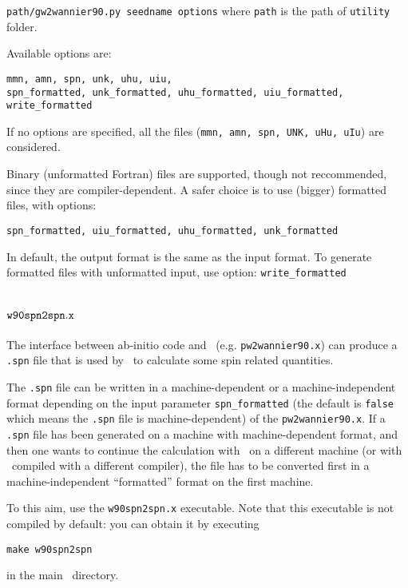 \verb|path/gw2wannier90.py seedname options|
\newline \newline
where \verb|path| is the path of \verb|utility| folder.\newline\newline

Available options are:
\begin{verbatim}
mmn, amn, spn, unk, uhu, uiu,
spn_formatted, unk_formatted, uhu_formatted, uiu_formatted,
write_formatted
\end{verbatim}

If no options are specified, all the files (\verb|mmn, amn, spn, UNK, uHu, uIu|) are considered.

Binary (unformatted Fortran) files are supported, though not reccommended, 
since they are compiler-dependent.
A safer choice is to use (bigger) formatted files, with options:

\verb|spn_formatted, uiu_formatted, uhu_formatted, unk_formatted|

In default, the output format is the same as the input format.
To generate formatted files with unformatted input, use option:
\verb|write_formatted|
\label{sec:w90aaa}

\section{$\tt{w90spn2spn.x}$\label{sec:w90spn2spn}}
The interface between ab-initio code and \wannier\ 
(e.g. \texttt{pw2wannier90.x}) can produce a
\verb|.spn| file that is used by \postw\ to 
calculate some spin related quantities.

The \verb|.spn| file can be 
written in a machine-dependent or a machine-independent format 
depending on the input parameter \texttt{spn\_formatted} 
(the default is \texttt{false} which means the \verb|.spn| file 
is machine-dependent) of the 
\texttt{pw2wannier90.x}. If a \verb|.spn| file has been generated 
on a machine with machine-dependent format, 
and then one wants to continue the calculation 
with \postw\ on a different machine 
(or with \postw\ compiled with a different compiler), 
the file has to be converted first in a machine-independent 
``formatted'' format on the first machine. 

To this aim, use the \verb|w90spn2spn.x| executable. Note that this
executable is not compiled by default: you can obtain it by executing 
\begin{verbatim}
make w90spn2spn
\end{verbatim}
in the main \wannier\ directory.

